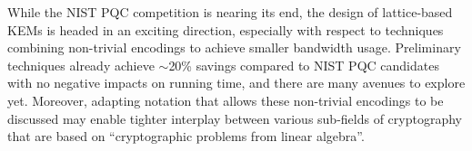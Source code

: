 While the NIST PQC competition is nearing its end, the design of lattice-based KEMs is headed in an exciting direction, especially with respect to techniques combining non-trivial encodings to achieve smaller bandwidth usage.
Preliminary techniques already achieve $\sim$20\% savings compared to NIST PQC candidates with no negative impacts on running time, and there are many avenues to explore yet.
Moreover, adapting notation that allows these non-trivial encodings to be discussed may enable tighter interplay between various sub-fields of cryptography that are based on ``cryptographic problems from linear algebra''.